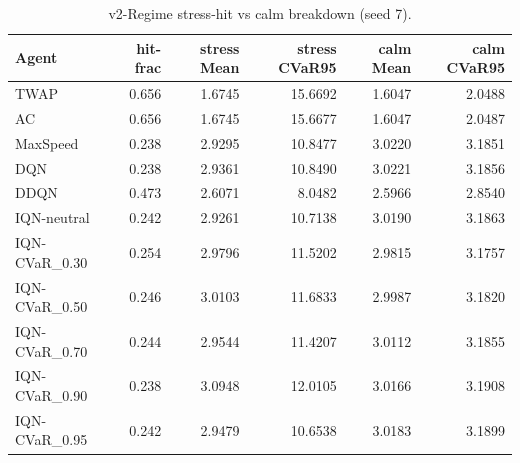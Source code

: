 \begin{table}[H]
    \centering
    \caption{v2-Regime stress-hit vs calm breakdown (seed 7).}
    \label{tab:v2_regime_breakdown}
    \begin{tabular}{@{}lrrrrr@{}}
        \toprule
        Agent & hit-frac & stress Mean & stress CVaR95 & calm Mean & calm CVaR95 \\
        \midrule
        TWAP & 0.656 & 1.6745 & 15.6692 & 1.6047 & 2.0488 \\
        AC & 0.656 & 1.6745 & 15.6677 & 1.6047 & 2.0487 \\
        MaxSpeed & 0.238 & 2.9295 & 10.8477 & 3.0220 & 3.1851 \\
        DQN & 0.238 & 2.9361 & 10.8490 & 3.0221 & 3.1856 \\
        DDQN & 0.473 & 2.6071 & 8.0482 & 2.5966 & 2.8540 \\
        IQN-neutral & 0.242 & 2.9261 & 10.7138 & 3.0190 & 3.1863 \\
        IQN-CVaR\_0.30 & 0.254 & 2.9796 & 11.5202 & 2.9815 & 3.1757 \\
        IQN-CVaR\_0.50 & 0.246 & 3.0103 & 11.6833 & 2.9987 & 3.1820 \\
        IQN-CVaR\_0.70 & 0.244 & 2.9544 & 11.4207 & 3.0112 & 3.1855 \\
        IQN-CVaR\_0.90 & 0.238 & 3.0948 & 12.0105 & 3.0166 & 3.1908 \\
        IQN-CVaR\_0.95 & 0.242 & 2.9479 & 10.6538 & 3.0183 & 3.1899 \\
        \bottomrule
    \end{tabular}
\end{table}
